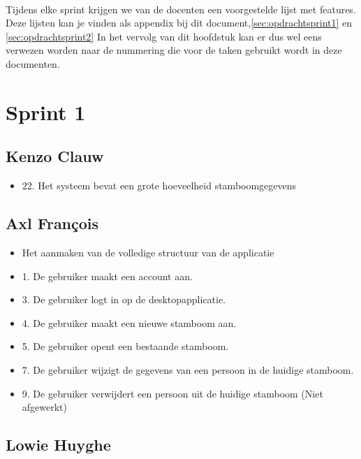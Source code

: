 \documentclass[pdftex,a4paper,12pt,twoside]{report}
\begin{document}
\paragraph{}
Tijdens elke sprint krijgen we van de docenten een voorgestelde lijst met features.
Deze lijsten kan je vinden als appendix bij dit document,\ref{sec:opdrachtsprint1} en \ref{sec:opdrachtsprint2}
In het vervolg van dit hoofdstuk kan er dus wel eens verwezen worden naar de nummering die voor de taken gebruikt wordt in deze documenten.

\section{Sprint 1}

\subsection{Kenzo Clauw}

\begin{itemize}
\item 22. Het systeem bevat een grote hoeveelheid stamboomgegevens
\end{itemize}

\subsection{Axl François}

\begin{itemize}
\item Het aanmaken van de volledige structuur van de applicatie
\item 1. De gebruiker maakt een account aan.
\item 3. De gebruiker logt in op de desktopapplicatie.
\item 4. De gebruiker maakt een nieuwe stamboom aan.
\item 5. De gebruiker opent een bestaande stamboom.
\item 7. De gebruiker wijzigt de gegevens van een persoon in de huidige stamboom. 
\item 9. De gebruiker verwijdert een persoon uit de huidige stamboom (Niet afgewerkt)
\end{itemize}

\subsection{Lowie Huyghe}
\end{document}
